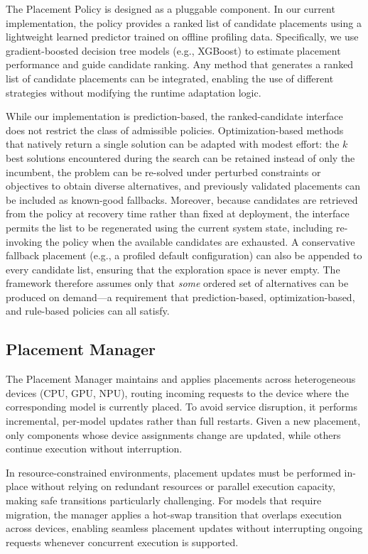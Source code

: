\documentclass[conference]{IEEEtran}
\begin{document}
The Placement Policy is designed as a pluggable component.
In our current implementation, the policy provides a ranked list of candidate placements using a lightweight learned predictor trained on offline profiling data.
Specifically, we use gradient-boosted decision tree models (e.g., XGBoost) to estimate placement performance and guide candidate ranking.
Any method that generates a ranked list of candidate placements can be integrated, enabling the use of different strategies without modifying the runtime adaptation logic.

While our implementation is prediction-based, the ranked-candidate interface does not restrict the class of admissible policies.
Optimization-based methods that natively return a single solution can be adapted with modest effort: the $k$ best solutions encountered during the search can be retained instead of only the incumbent, the problem can be re-solved under perturbed constraints or objectives to obtain diverse alternatives, and previously validated placements can be included as known-good fallbacks.
Moreover, because candidates are retrieved from the policy at recovery time rather than fixed at deployment, the interface permits the list to be regenerated using the current system state, including re-invoking the policy when the available candidates are exhausted.
A conservative fallback placement (e.g., a profiled default configuration) can also be appended to every candidate list, ensuring that the exploration space is never empty.
The framework therefore assumes only that \emph{some} ordered set of alternatives can be produced on demand---a requirement that prediction-based, optimization-based, and rule-based policies can all satisfy.

\subsection{Placement Manager}
\label{sec:placement_manager}
The Placement Manager maintains and applies placements across heterogeneous devices (CPU, GPU, NPU), routing incoming requests to the device where the corresponding model is currently placed.
%
To avoid service disruption, it performs incremental, per-model updates rather than full restarts. 
Given a new placement, only components whose device assignments change are updated, while others continue execution without interruption.

In resource-constrained environments, placement updates must be performed in-place without relying on redundant resources or parallel execution capacity, making safe transitions particularly challenging.
%
For models that require migration, the manager applies a hot-swap transition that overlaps execution across devices, enabling seamless placement updates without interrupting ongoing requests whenever concurrent execution is supported.
\end{document}
